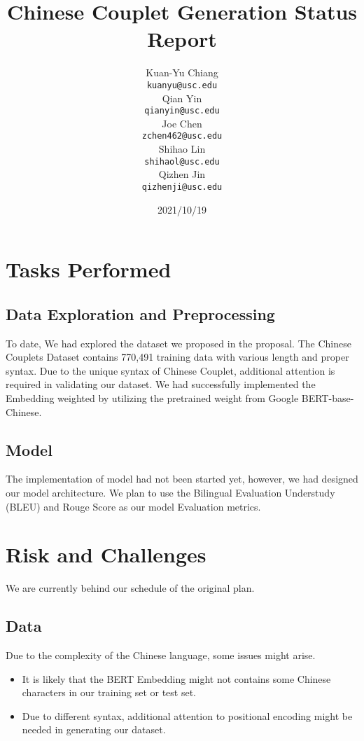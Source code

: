 \documentclass[11pt]{article}
\title{Chinese Couplet Generation Status Report}
\author{
  Kuan-Yu Chiang\\
  \texttt{kuanyu@usc.edu}
  \\\And
  Qian Yin\\
  \texttt{qianyin@usc.edu}
  \\\And
  Joe Chen\\
  \texttt{zchen462@usc.edu}
  \\\AND
  Shihao Lin\\
  \texttt{shihaol@usc.edu}
  \\\And
  Qizhen Jin\\
  \texttt{qizhenji@usc.edu}
}
\date{2021/10/19}
\begin{document}
\maketitle

\section{Tasks Performed}


\subsection{Data Exploration and Preprocessing}

To date, We had explored the dataset we proposed in the proposal. The Chinese Couplets Dataset contains 770,491 training data with various length and proper syntax. Due to the unique syntax of Chinese Couplet, additional attention is required in validating our dataset. We had successfully implemented the Embedding weighted by utilizing the pretrained weight from Google BERT-base-Chinese. 

\subsection{Model}

The implementation of model had not been started yet, however, we had designed our model architecture. We plan to use the Bilingual Evaluation Understudy (BLEU) and Rouge Score as our model Evaluation metrics.

\section{Risk and Challenges}

We are currently behind our schedule of the original plan. 

\subsection{Data}

Due to the complexity of the Chinese language, some issues might arise. 

\begin{itemize}
  \item It is likely that the BERT Embedding might not contains some Chinese characters in our training set or test set.
  \item Due to different syntax, additional attention to positional encoding might be needed in generating our dataset.
\end{itemize}
\end{document}
